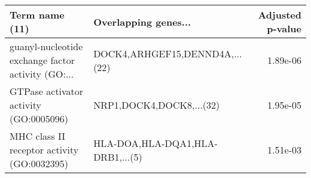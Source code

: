 \begin{tabular}{llr}
\toprule
                                    Term name (11) &             Overlapping genes... &  Adjusted p-value \\
\midrule
guanyl-nucleotide exchange factor activity (GO:... &   DOCK4,ARHGEF15,DENND4A,...(22) &          1.89e-06 \\
            GTPase activator activity (GO:0005096) &         NRP1,DOCK4,DOCK8,...(32) &          1.95e-05 \\
       MHC class II receptor activity (GO:0032395) & HLA-DOA,HLA-DQA1,HLA-DRB1,...(5) &          1.51e-03 \\
\bottomrule
\end{tabular}
